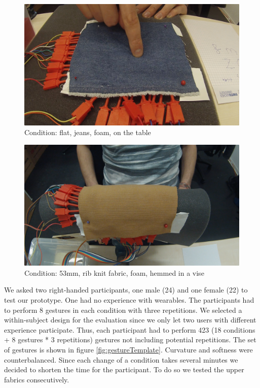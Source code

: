 \begin{figure}
\includegraphics[scale=0.15]{images/topview.jpg}
\caption{Condition: flat, jeans, foam, on the table}
\label{fig:topview}
\end{figure}\begin{figure}
\includegraphics[scale=0.15]{images/53mmtopview.jpg}
\caption{Condition: 53mm, rib knit fabric, foam, hemmed in  a vise}
\label{fig:53mmtopview}
\end{figure}We asked two right-handed participants, one male (24) and one female (22) to test our prototype. One had no experience with wearables. The participants had to perform 8 gestures in each condition with three repetitions. We selected a within-subject design for the evaluation since we only let two users with different experience participate. Thus, each participant had to perform 423 (18 conditions + 8  gestures * 3 repetitions) gestures not including potential repetitions. The set of gestures is shown in figure \ref{fig:gestureTemplate}. Curvature and softness were counterbalanced. Since each change of a condition takes several minutes we decided to shorten the time for the participant. To do so we tested the upper fabrics consecutively. \\
